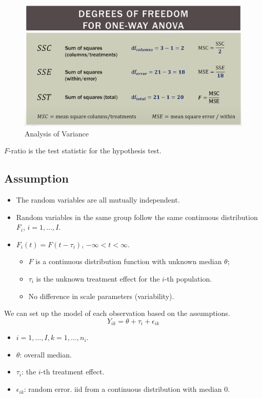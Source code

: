 \begin{figure}[H]
	\centering
	\includegraphics[width=0.7\linewidth]{fig/anova}
	\caption{Analysis of Variance}
	\label{fig:anova}
\end{figure}

$F$-ratio is the test statistic for the hypothesis test.

\subsection{Assumption}
\begin{itemize}
	\item The random variables are all mutually independent.
	\item Random variables in the same group follow the same continuous distribution $F_i$, $i=1, \dots, I$.
	\item $F_i(t) = F(t-\tau_i)$, $-\infty < t < \infty$.
	\begin{itemize}
		\item $F$ is a continuous distribution function with unknown median $\theta$;
		\item $\tau_i$ is the unknown treatment effect for the $i$-th population.
		\item No difference in scale parameters (variability).
	\end{itemize}
\end{itemize}

We can set up the model of each observation based on the assumptions.
\[Y_{ik} = \theta + \tau_i + \epsilon_{ik}\]

\begin{itemize}
	\item $i = 1, \dots, I, k = 1, \dots, n_i$.
	\item $\theta$: overall median.
	\item $\tau_i$: the $i$-th treatment effect.
	\item $\epsilon_{ik}$: random error. iid from a continuous distribution with median 0.
\end{itemize}

